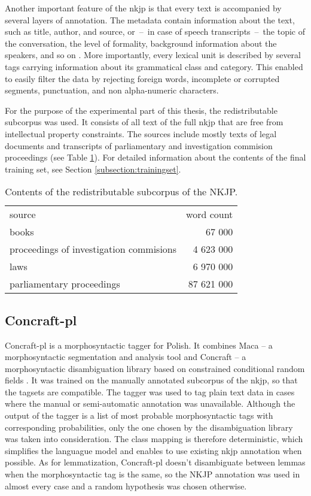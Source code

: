 Another important feature of the \gls{nkjp} is that every text is accompanied by several layers of annotation. The metadata contain information about the text, such as title, author, and source, or~--~in case of speech transcripts~--~the topic of the conversation, the level of formality, background information about the speakers, and so on \cite{przepiorkowski2009xml}. More importantly, every lexical unit is described by several tags carrying information about its grammatical class and category. This enabled to easily filter the data by rejecting foreign words, incomplete or corrupted segments, punctuation, and non alpha-numeric characters. 

For the purpose of the experimental part of this thesis, the redistributable subcorpus was used. It consists of all text of the full \gls{nkjp} that are free from intellectual property constraints. The sources include mostly texts of legal documents and transcripts of parliamentary and investigation commision proceedings (see Table \ref{table:freenkjp}). For detailed information about the contents of the final training set, see Section \ref{subsection:trainingset}.

\begin{table}[h!]
  \begin{center}
	  \caption{Contents of the redistributable subcorpus of the NKJP.}
	    \label{table:freenkjp}
	    \begin{tabular*}{.6\linewidth}{@{\extracolsep{\fill}}lr}
      source & word count \\
      \cmidrule{1-2}
      books & 67 000\\
      proceedings of investigation commisions & 4 623 000\\
      laws & 6 970 000\\
      parliamentary proceedings & 87 621 000\\
    \end{tabular*}
  \end{center}
\end{table}

\subsection{Concraft-pl}
Concraft-pl is a morphosyntactic tagger for Polish. It combines Maca -- a morphosyntactic segmentation and analysis tool and Concraft -- a morphosyntactic disambiguation library based on constrained conditional random fields \cite{waszczuk2012harnessing}. It was trained on the manually annotated subcorpus of the \gls{nkjp}, so that the tagsets are compatible. The tagger was used to tag plain text data in cases where the manual or semi-automatic annotation was unavailable. Although the output of the tagger is a list of most probable morphosyntactic tags with corresponding probabilities, only the one chosen by the disambiguation library was taken into consideration. The class mapping is therefore deterministic, which simplifies the languague model and enables to use existing \gls{nkjp} annotation when possible. As for lemmatization, Concraft-pl doesn't disambiguate between lemmas when the morphosyntactic tag is the same, so the NKJP annotation was used in almost every case and a random hypothesis was chosen otherwise.

